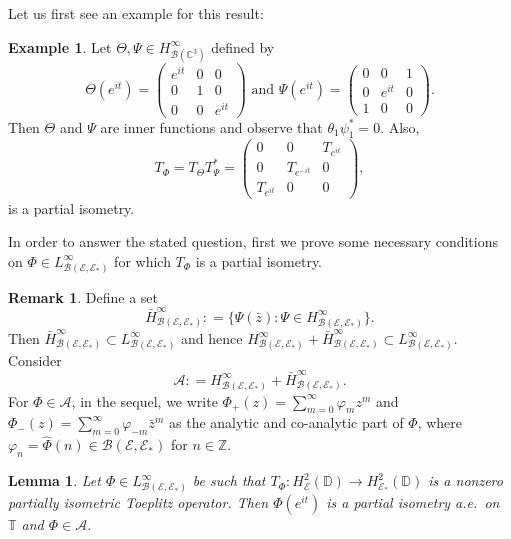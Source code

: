 \documentclass[12pt]{amsart}
\newcommand{\cla}{\mathcal{A}}
\newcommand{\clb}{\mathcal{B}}
\newcommand{\cle}{\mathcal{E}}
\newcommand{\C}{\mathbb{C}}
\newcommand{\D}{\mathbb{D}}
\newcommand{\Z}{\mathbb{Z}}
\newcommand{\T}{\mathbb{T}}
\theoremstyle{definition}
\theoremstyle{plain}
\newtheorem{lem}[thm]{Lemma}
\theoremstyle{definition}
\newtheorem{rem}[thm]{Remark}
\newtheorem{ex}[thm]{Example}
\numberwithin{equation}{section}
\let\phi=\varphi
\begin{document}
Let us first see an example for this result:

\begin{ex}
Let $\Theta, \Psi \in H^\infty _{\clb(\C^3)}$ defined by
\[
\Theta(e^{it})=\begin{pmatrix}
e^{it} & 0 &0\\
0 &1 &0\\
0 &0 &e^{it}
\end{pmatrix}
\text{ and }
\Psi(e^{it})=\begin{pmatrix}
0 &0 & 1\\
0 & e^{it} &0\\
1 & 0 &0
\end{pmatrix}.
\]
Then $\Theta$ and $\Psi$ are inner functions and observe that $\theta_1 \psi_1^*=0$. Also,
\[T_\Phi=T_\Theta T_\Psi^*=\begin{pmatrix}
0 & 0 & T_{e^{it}}\\
0 & T_{e^{-it}} &0\\
T_{e^{it}} & 0 &0
\end{pmatrix},
\]
is a partial isometry.
\end{ex}




In order to answer the stated question, first we prove some necessary conditions on $\Phi \in L^\infty_{\clb(\cle,\cle_*)}$ for which $T_\Phi$ is a partial isometry.


\begin{rem}
Define a set 
\[
\bar{H}^\infty_{\clb(\cle,\cle_*)}: = \{\Psi(\bar{z}): \Psi \in H^\infty_{\clb(\cle,\cle_*)}\}.
\]
Then $\bar{H}^\infty_{\clb(\cle,\cle_*)} \subset L^\infty_{\clb(\cle,\cle_*)}$ and hence ${H}^\infty_{\clb(\cle,\cle_*)}+\bar{H}^\infty_{\clb(\cle,\cle_*)} \subset L^\infty_{\clb(\cle,\cle_*)}$. Consider 
\[
\cla : = {H}^\infty_{\clb(\cle,\cle_*)}+\bar{H}^\infty_{\clb(\cle,\cle_*)}.
\]
For $\Phi \in \cla$, in the sequel, we write $\Phi_+(z)=\sum\limits_{m=0}^\infty \phi_mz^m$ and $\Phi_-(z)=\sum\limits_{m=0}^\infty \phi_{-m}\bar{z}^m$ as the analytic and co-analytic part of $\Phi$, where $\phi_n =\widehat{\Phi}(n)\in \clb(\cle,\cle_*)$ for $n \in \Z$.

\end{rem}

\begin{lem}\label{NC1}
Let $\Phi \in L^\infty_{\clb(\cle,\cle_*)}$ be such that $T_\Phi: H^2_\cle(\D) \rightarrow H^2_{\cle_*}(\D)$ is a nonzero partially isometric Toeplitz operator. Then $\Phi(e^{it})$ is a partial isometry a.e.\ on $\T$ and $\Phi \in \cla.$
\end{lem}
\end{document}
